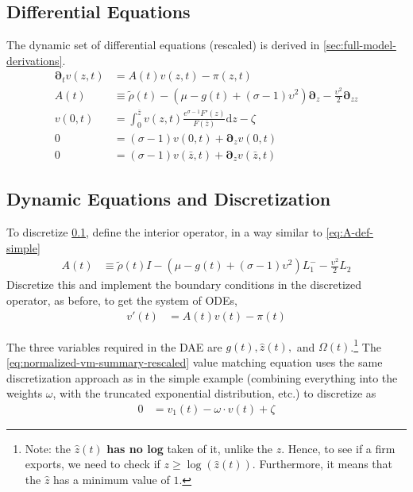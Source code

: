 \documentclass[11pt]{article}
\newcommand{\D}[1][]{\ensuremath{\boldsymbol{\partial}_{#1}}}
\newcommand{\diff}{\ensuremath{\mathrm{d}}}
\begin{document}
\subsection{Differential Equations}\label{sec:full-ODE}
The dynamic set of differential equations (rescaled) is derived in \cref{sec:full-model-derivations}.
\begin{align}
	\D[t]v(z,t) &= A(t)v(z,t) - \pi(z,t) \\
	A(t) &\equiv \tilde{\rho}(t)  - (\mu - g(t) + (\sigma - 1)\upsilon^2)\D[z] - \frac{\upsilon^2}{2}\D[zz]\\
	v(0,t) &= \int_{0}^{\bar{z}}v(z,t) \frac{e^{\sigma - 1}F'(z)}{F(\bar{z})} \diff z - \zeta\\
	0 &= (\sigma - 1)v(0,t) + \D[z]v(0,t)\\
	0 &= (\sigma - 1)v(\bar{z},t) + \D[z]v(\bar{z},t)
\end{align}




\subsection{Dynamic Equations and Discretization}
To discretize \cref{sec:full-ODE}, define the interior operator, in a way similar to \cref{eq:A-def-simple}
\begin{align}
	A(t) &\equiv \tilde{\rho}(t) I - (\mu - g(t) + (\sigma - 1)\upsilon^2) L^{-}_1 - \frac{\upsilon^2}{2} L_2\label{eq:A-def-full}
	\end{align}
Discretize this and implement the boundary conditions in the discretized operator, as before, to get the system of ODEs,
\begin{align}
	v'(t) &= A(t) v(t) - \pi(t)
\end{align}

The three variables required in the DAE are $g(t), \hat{z}(t),$ and $\Omega(t)$.\footnote{Note: the $\hat{z}(t)$ \textbf{has no log} taken of it, unlike the $z$.  Hence, to see if a firm exports, we need to check if $z \geq \log(\hat{z}(t))$.  Furthermore, it means that the $\hat{z}$ has a minimum value of $1$.}  The \cref{eq:normalized-vm-summary-rescaled} value matching equation uses the same discretization approach as in the simple example (combining everything into the weights $\omega$, with the truncated exponential distribution, etc.) to discretize as
\begin{align}
	0 &= v_1(t) - \omega \cdot v(t) + \zeta
\end{align}
\end{document}
